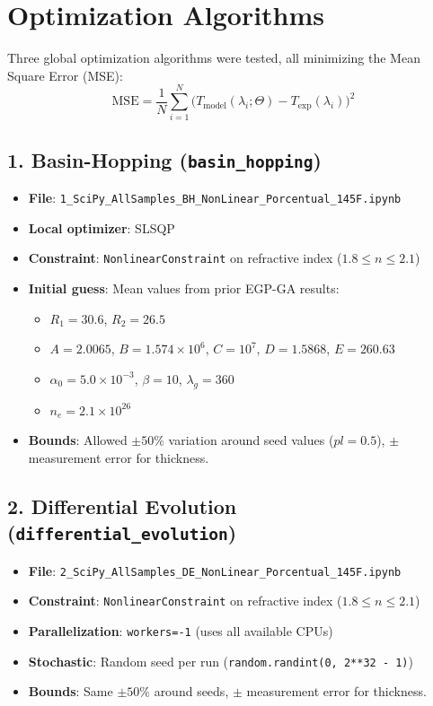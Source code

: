 \documentclass[11pt,a4paper]{article}
\begin{document}
\section{Optimization Algorithms}

Three global optimization algorithms were tested, all minimizing the Mean Square Error (MSE):
\begin{equation*}
    \text{MSE} = \frac{1}{N}\sum_{i=1}^{N} \big(T_{\text{model}}(\lambda_i; \Theta) - T_{\text{exp}}(\lambda_i)\big)^2
\end{equation*}

\subsection{1. Basin-Hopping ({\tt basin\_hopping})}
\begin{itemize}
    \item \textbf{File}: {\tt 1\_SciPy\_AllSamples\_BH\_NonLinear\_Porcentual\_145F.ipynb}
    \item \textbf{Local optimizer}: SLSQP
    \item \textbf{Constraint}: {\tt NonlinearConstraint} on refractive index ($1.8 \leq n \leq 2.1$)
    \item \textbf{Initial guess}: Mean values from prior EGP-GA results:
    \begin{itemize}
        \item $R_1 = 30.6$, $R_2 = 26.5$
        \item $A = 2.0065$, $B = 1.574 \times 10^6$, $C = 10^7$, $D = 1.5868$, $E = 260.63$
        \item $\alpha_0 = 5.0 \times 10^{-3}$, $\beta = 10$, $\lambda_g = 360$
        \item $n_e = 2.1 \times 10^{26}$
    \end{itemize}
    \item \textbf{Bounds}: Allowed $\pm 50\%$ variation around seed values ($pl = 0.5$), $\pm$ measurement error for thickness.
\end{itemize}

\subsection{2. Differential Evolution ({\tt differential\_evolution})}
\begin{itemize}
    \item \textbf{File}: {\tt 2\_SciPy\_AllSamples\_DE\_NonLinear\_Porcentual\_145F.ipynb}
    \item \textbf{Constraint}: {\tt NonlinearConstraint} on refractive index ($1.8 \leq n \leq 2.1$)
    \item \textbf{Parallelization}: {\tt workers=-1} (uses all available CPUs)
    \item \textbf{Stochastic}: Random seed per run ({\tt random.randint(0, 2**32 - 1)})
    \item \textbf{Bounds}: Same $\pm 50\%$ around seeds, $\pm$ measurement error for thickness.
\end{itemize}
\end{document}
